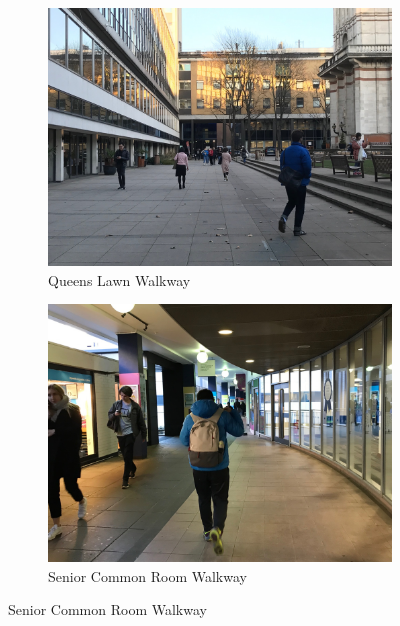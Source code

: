 \documentclass[12pt,a4paper]{report}
\begin{document}
\begin{figure}[ht]
	\begin{subfigure}[b]{.5\textwidth}
		\centering
		\includegraphics[width=.8\linewidth]{Images/Evaluation/HumanDetection/IMG_4071.jpg}
		\caption{Queens Lawn Walkway}
	\end{subfigure}%
	\hspace{\fill} 
	\begin{subfigure}[b]{.5\textwidth}
		\centering
		\includegraphics[width=.8\linewidth]{Images/Evaluation/HumanDetection/IMG_4077.jpg}
		\caption{Senior Common Room Walkway}
	\end{subfigure}

	\vspace{4ex}  %
	

\end{figure}
\end{document}
